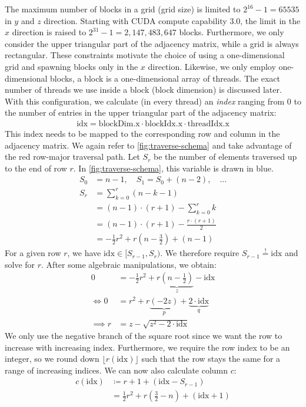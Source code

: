 The maximum number of blocks in a grid (grid size) is limited to $2^{16} - 1 = 65535$ in $y$ and $z$ direction. Starting with CUDA compute capability 3.0, the limit in the $x$ direction is raised to $2^{31} - 1 = 2,147,483,647$ blocks. Furthermore, we only consider the upper triangular part of the adjacency matrix, while a grid is always rectangular. These constraints motivate the choice of using a one-dimensional grid and spawning blocks only in the $x$ direction. Likewise, we only employ one-dimensional blocks, \ie a block is a one-dimensional array of threads. The exact number of threads we use inside a block (block dimension) is discussed later. With this configuration, we calculate (in every thread) an \textit{index} ranging from $0$ to the number of entries in the upper triangular part of the adjacency matrix:
\begin{align}
    \text{idx} = \text{blockDim.x} \cdot \text{blockIdx.x} \cdot \text{threadIdx.x}
\end{align}
This index needs to be mapped to the corresponding row and column in the adjacency matrix. We again refer to \autoref{fig:traverse-schema} and take advantage of the red row-major traversal path. Let $S_r$ be the number of elements traversed up to the end of row $r$. In \autoref{fig:traverse-schema}, this variable is drawn in blue.
\begin{align}
    S_0 &= n-1, \quad S_1 = S_0 + (n-2), \quad\ldots\\
    S_r &= \sum_{k=0}^{r} (n-k-1)\\
    &= (n-1) \cdot (r+1) - \sum_{k=0}^{r} k\\
    &= (n-1) \cdot (r+1) - \frac{r \cdot (r+1)}{2}\\
    &= -\frac{1}{2}r^2 + r \left(n- \frac{3}{2}\right) + (n-1)
\end{align}
For a given row $r$, we have $\text{idx} \in [S_{r-1}, S_r)$. We therefore require $S_{r-1} \overset{!}{=} \text{idx}$ and solve for $r$. After some algebraic manipulations, we obtain:
\begin{align}
    0 &= -\frac{1}{2} r^2 + r \underbrace{\left(n - \frac{1}{2}\right)}_z - \text{idx}\\
    \iff 0 &= r^2 + r \underbrace{(-2z)}_p + \underbrace{2 \cdot \text{idx}}_q\\
    \implies r &= z - \sqrt{z^2 - 2\cdot \text{idx}}
    \label{eq:row-index}
\end{align}
We only use the negative branch of the square root since we want the row to increase with increasing index. Furthermore, we require the row index to be an integer, so we round down $\lfloor r(\text{idx}) \rfloor$ such that the row stays the same for a range of increasing indices. We can now also calculate column $c$:
\begin{align}
    c(\text{idx}) &\coloneqq r + 1 + (\text{idx} - S_{r-1})\\
    &= \frac{1}{2} r^2 + r \left(\frac{3}{2} - n\right) + (\text{idx} + 1)
\end{align}
